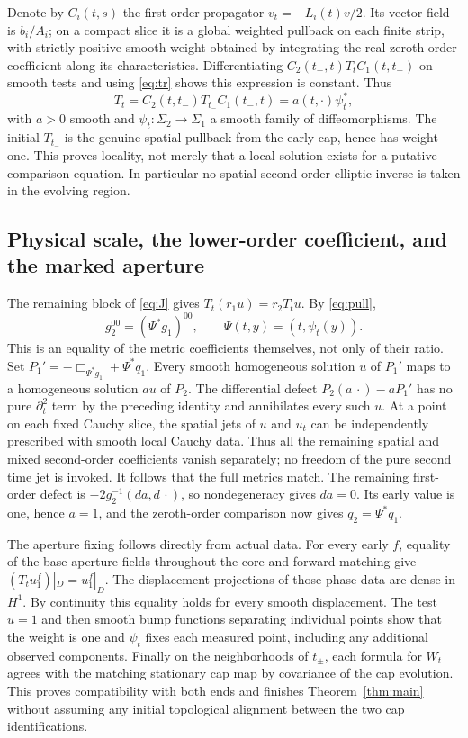 \documentclass[11pt]{article}
\numberwithin{equation}{section}
\begin{document}
Denote by \(C_i(t,s)\) the first-order propagator \(v_t=-L_i(t)v/2\). Its vector field is \(b_i/A_i\); on a compact slice it is a global weighted pullback on each finite strip, with strictly positive smooth weight obtained by integrating the real zeroth-order coefficient along its characteristics. Differentiating \(C_2(t_-,t)T_t C_1(t,t_-)\) on smooth tests and using \eqref{eq:tr} shows this expression is constant. Thus
\begin{equation}\label{eq:pull}
 T_t=C_2(t,t_-)T_{t_-}C_1(t_-,t)=a(t,\cdot)\psi_t^* ,
\end{equation}
with \(a>0\) smooth and \(\psi_t:\Sigma_2\to\Sigma_1\) a smooth family of diffeomorphisms. The initial \(T_{t_-}\) is the genuine spatial pullback from the early cap, hence has weight one. This proves locality, not merely that a local solution exists for a putative comparison equation. In particular no spatial second-order elliptic inverse is taken in the evolving region.

\subsection{Physical scale, the lower-order coefficient, and the marked aperture}

The remaining block of \eqref{eq:J} gives \(T_t(r_1u)=r_2T_tu\). By \eqref{eq:pull},
\[
 g_2^{00}=(\Psi^*g_1)^{00},\qquad \Psi(t,y)=(t,\psi_t(y)).
\]
This is an equality of the metric coefficients themselves, not only of their ratio. Set \(P_1'=-\Box_{\Psi^*g_1}+\Psi^*q_1\). Every smooth homogeneous solution \(u\) of \(P_1'\) maps to a homogeneous solution \(a u\) of \(P_2\). The differential defect \(P_2(a\,\cdot)-aP_1'\) has no pure \(\partial_t^2\) term by the preceding identity and annihilates every such \(u\). At a point on each fixed Cauchy slice, the spatial jets of \(u\) and \(u_t\) can be independently prescribed with smooth local Cauchy data. Thus all the remaining spatial and mixed second-order coefficients vanish separately; no freedom of the pure second time jet is invoked. It follows that the full metrics match. The remaining first-order defect is \(-2g_2^{-1}(da,d\,\cdot)\), so nondegeneracy gives \(da=0\). Its early value is one, hence \(a=1\), and the zeroth-order comparison now gives \(q_2=\Psi^*q_1\).

The aperture fixing follows directly from actual data. For every early \(f\), equality of the base aperture fields throughout the core and forward matching give \((T_tu_1^f)|_D=u_1^f|_D\). The displacement projections of those phase data are dense in \(H^1\). By continuity this equality holds for every smooth displacement. The test \(u=1\) and then smooth bump functions separating individual points show that the weight is one and \(\psi_t\) fixes each measured point, including any additional observed components. Finally on the neighborhoods of \(t_\pm\), each formula for \(W_t\) agrees with the matching stationary cap map by covariance of the cap evolution. This proves compatibility with both ends and finishes Theorem~\ref{thm:main} without assuming any initial topological alignment between the two cap identifications.
\end{document}
